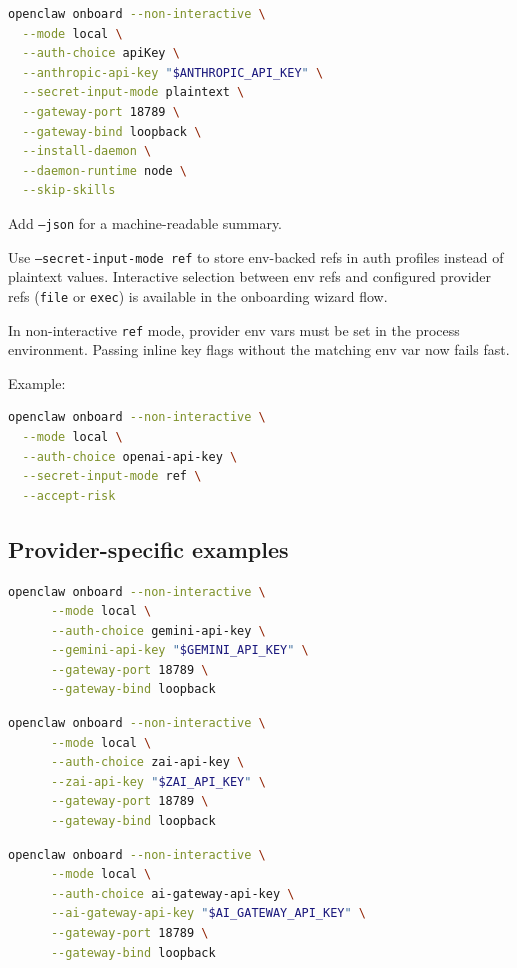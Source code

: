 \begin{lstlisting}[language=bash]
openclaw onboard --non-interactive \
  --mode local \
  --auth-choice apiKey \
  --anthropic-api-key "$ANTHROPIC_API_KEY" \
  --secret-input-mode plaintext \
  --gateway-port 18789 \
  --gateway-bind loopback \
  --install-daemon \
  --daemon-runtime node \
  --skip-skills
\end{lstlisting}


Add \texttt{--json} for a machine-readable summary.

Use \texttt{--secret-input-mode ref} to store env-backed refs in auth profiles instead of plaintext values.
Interactive selection between env refs and configured provider refs (\texttt{file} or \texttt{exec}) is available in the onboarding wizard flow.

In non-interactive \texttt{ref} mode, provider env vars must be set in the process environment.
Passing inline key flags without the matching env var now fails fast.

Example:

\begin{lstlisting}[language=bash]
openclaw onboard --non-interactive \
  --mode local \
  --auth-choice openai-api-key \
  --secret-input-mode ref \
  --accept-risk
\end{lstlisting}


\subsection{Provider-specific examples}


\begin{lstlisting}[language=bash]
    openclaw onboard --non-interactive \
      --mode local \
      --auth-choice gemini-api-key \
      --gemini-api-key "$GEMINI_API_KEY" \
      --gateway-port 18789 \
      --gateway-bind loopback
\end{lstlisting}

\begin{lstlisting}[language=bash]
    openclaw onboard --non-interactive \
      --mode local \
      --auth-choice zai-api-key \
      --zai-api-key "$ZAI_API_KEY" \
      --gateway-port 18789 \
      --gateway-bind loopback
\end{lstlisting}

\begin{lstlisting}[language=bash]
    openclaw onboard --non-interactive \
      --mode local \
      --auth-choice ai-gateway-api-key \
      --ai-gateway-api-key "$AI_GATEWAY_API_KEY" \
      --gateway-port 18789 \
      --gateway-bind loopback
\end{lstlisting}

